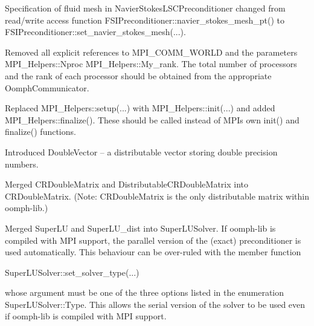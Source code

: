 \begin{DoxyItemize}
\item Specification of fluid mesh in {\ttfamily Navier\+Stokes\+L\+S\+C\+Preconditioner} changed from read/write access function {\ttfamily F\+S\+I\+Preconditioner\+::navier\+\_\+stokes\+\_\+mesh\+\_\+pt()} to {\ttfamily F\+S\+I\+Preconditioner\+::set\+\_\+navier\+\_\+stokes\+\_\+mesh}(...). ~\newline
~\newline

\item Removed all explicit references to {\ttfamily M\+P\+I\+\_\+\+C\+O\+M\+M\+\_\+\+W\+O\+R\+LD} and the parameters {\ttfamily M\+P\+I\+\_\+\+Helpers\+::\+Nproc} {\ttfamily M\+P\+I\+\_\+\+Helpers\+::\+My\+\_\+rank}. The total number of processors and the rank of each processor should be obtained from the appropriate {\ttfamily Oomph\+Communicator}. ~\newline
~\newline

\item Replaced {\ttfamily M\+P\+I\+\_\+\+Helpers\+::setup}(...) with {\ttfamily M\+P\+I\+\_\+\+Helpers\+::init}(...) and added {\ttfamily M\+P\+I\+\_\+\+Helpers\+::finalize()}. These should be called instead of M\+PI\textquotesingle{}s own {\ttfamily init()} and {\ttfamily finalize()} functions. ~\newline
~\newline

\item Introduced {\ttfamily Double\+Vector} -- a distributable vector storing double precision numbers. ~\newline
~\newline

\item Merged {\ttfamily C\+R\+Double\+Matrix} and {\ttfamily Distributable\+C\+R\+Double\+Matrix} into {\ttfamily C\+R\+Double\+Matrix}. (Note\+: {\ttfamily C\+R\+Double\+Matrix} is the only distributable matrix within {\ttfamily oomph-\/lib}.) ~\newline
~\newline

\item Merged {\ttfamily Super\+LU} and {\ttfamily Super\+L\+U\+\_\+dist} into {\ttfamily Super\+L\+U\+Solver}. If {\ttfamily oomph-\/lib} is compiled with M\+PI support, the parallel version of the (exact) preconditioner is used automatically. This behaviour can be over-\/ruled with the member function 
\begin{DoxyCode}
SuperLUSolver::set\_solver\_type(...)
\end{DoxyCode}
 whose argument must be one of the three options listed in the enumeration {\ttfamily Super\+L\+U\+Solver\+::\+Type}. This allows the serial version of the solver to be used even if {\ttfamily oomph-\/lib} is compiled with M\+PI support. ~\newline
~\newline


\end{DoxyItemize}
